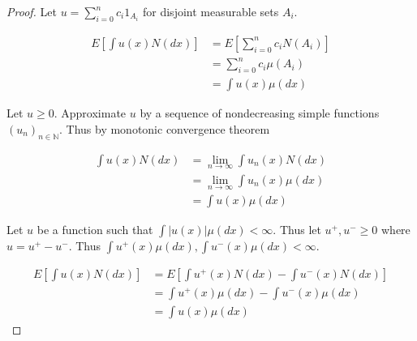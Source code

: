 \documentclass{article}
\newcommand{\N}{\mathbb{N}}
\newcommand{\abs}[1]{\left\lvert #1\right\rvert}
\begin{document}
\begin{proof}
    Let $u = \sum_{i = 0}^n c_i 1_{A_i}$ for disjoint measurable sets $A_i$. 
    
    \begin{align*}
        E\left[\int u(x) N(dx)\right] &= E\left[\sum_{i = 0}^n c_i N(A_i)\right] \\
        &=  \sum_{i = 0}^{n} c_i \mu(A_i) \\
        &= \int u(x) \mu(dx)
    \end{align*} 

    Let $u \geq 0$. Approximate $u$ by a sequence of nondecreasing simple functions $\left(u_n\right)_{n \in \N}$. Thus by monotonic convergence theorem 
    
    \begin{align*}
        \int u(x) N(dx) &= \lim_{n \to \infty} \int u_n(x) N(dx) \\
        &= \lim_{n \to \infty} \int u_n(x) \mu(dx) \\
        &= \int u(x) \mu(dx)
    \end{align*} 

    Let $u$ be a function such that $\int \abs{u(x)} \mu(dx) < \infty$. Thus let $u^+, u^- \geq 0$ where $u = u^+ - u^-$. Thus $\int u^+(x) \mu(dx), \int u^-(x) \mu(dx) < \infty$.    
    
    \begin{align*}
        E\left[\int u(x) N(dx)\right] &= E\left[\int u^+(x) N(dx) - \int u^-(x) N(dx)\right] \\
        &= \int u^+(x) \mu(dx) - \int u^-(x) \mu(dx) \\
        &= \int u(x) \mu(dx) 
    \end{align*}
\end{proof}
\end{document}
